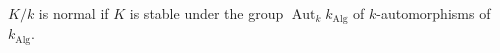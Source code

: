 $K/k$ is normal if $K$ is stable under the group $\operatorname{Aut}_k k_{\text{Alg}}$ of $k$-automorphisms of $k_{\text{Alg}}$.
